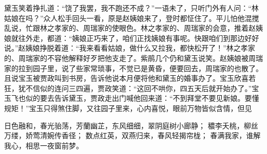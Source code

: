 \documentclass[12pt,oneside]{book}
\begin{document}
黛玉笑着挣扎道：“饶了我罢，我不跑还不成？”一语未了，只听门外有人问：“林姑娘在吗？”众人松手回头一看，原是赵姨娘来了，登时都怔住了。平儿怕他混搅乱说，忙跟林之孝家的、周瑞家的使眼色。林之孝家的、周瑞家的会意，推着赵姨娘就往外走，都道：“姨娘正巧来了，咱们正找姨娘有事呢。快跟咱们到那边好好说。”赵姨娘挣脱着道：“我来看看姑娘，做什么又拉我，都快松开了！”林之孝家的、周瑞家的不容他解释好歹把他支走了。紫鹃几个仍和黛玉说笑。赵姨娘被周瑞家的拉到园子里，说了些家常琐事，不觉已是黄昏，便要回去，周瑞家的也散了。
且说宝玉被贾政叫到书房，告诉他说本月便将他和黛玉的婚事办了。宝玉欣喜若狂，犹不信似的连问三四遍，贾政笑道：“这回不哄你，四五天后就开始办了。”宝玉飞也似的要去告诉黛玉，贾政走出门喊他回来道：“不到拜堂不要见新娘。要懂规矩！”宝玉只得煞住脚，又往园子里来，心内喜悦，眼前万物皆似含情，但见

日色融和，春光骀荡，芳蘭幽芷，东风细细，翠阴庭树小廊静；
穠李夭桃，柳丝万缕，娇莺清婉传香径；
数点红英，双燕归来，春风轻揭帘栊；
春满我家，谁解我心，相思一夜窗前梦。
\end{document}
